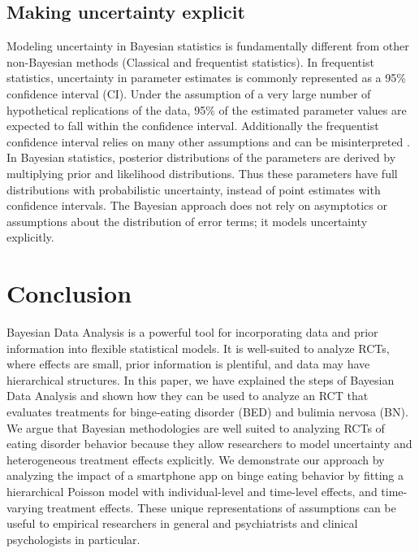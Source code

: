 \documentclass{article}
\begin{document}
\subsection*{Making uncertainty explicit}
Modeling uncertainty in Bayesian statistics is fundamentally different from other non-Bayesian methods (Classical and frequentist statistics). In frequentist statistics, uncertainty in parameter estimates is commonly represented as a 95\% confidence interval (CI). Under the assumption of a very large number of hypothetical replications of the data, 95\% of the estimated parameter values are expected to fall within the confidence interval. Additionally the frequentist confidence interval relies on many other assumptions and can be misinterpreted \cite{hoekstra2014robust}. In Bayesian statistics, posterior distributions of the parameters are derived by multiplying prior and likelihood distributions. Thus these parameters have full distributions with probabilistic uncertainty, instead of point estimates with confidence intervals. The Bayesian approach does not rely on asymptotics or assumptions about the distribution of error terms; it models uncertainty explicitly.


\section*{Conclusion}
Bayesian Data Analysis is a powerful tool for incorporating data and prior information into flexible statistical models.  It is well-suited to analyze RCTs, where effects are small, prior information is plentiful, and data may have hierarchical structures.  In this paper, we have explained the steps of Bayesian Data Analysis and shown how they can be used to analyze an RCT that evaluates treatments for binge-eating disorder (BED) and bulimia nervosa (BN).  We argue that Bayesian methodologies are well suited to analyzing RCTs of eating disorder behavior because they allow researchers to model uncertainty and heterogeneous treatment effects explicitly. We demonstrate our approach by analyzing the impact of a smartphone app on binge eating behavior by fitting a hierarchical Poisson model with individual-level and time-level effects, and time-varying treatment effects.  These unique representations of assumptions can be useful to empirical researchers in general and psychiatrists and clinical psychologists in particular.
 
 \newpage
 
\end{document}
